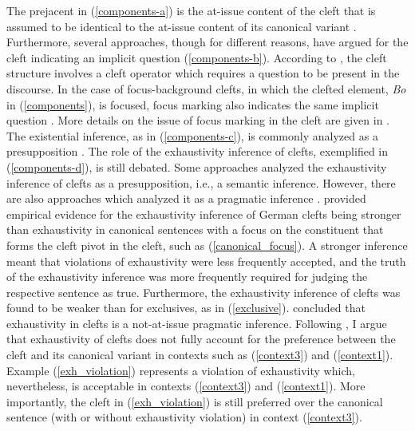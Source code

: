 \documentclass[output=paper,colorlinks,citecolor=brown]{langscibook}
\begin{document}
The prejacent in (\ref{components-a}) is the at-issue content of the cleft that is assumed to be identical to the at-issue content of its canonical variant \citep[see][]{deveaugh-geiss_et_al_2018b}. Furthermore, several approaches, though for different reasons, have argued for the cleft indicating an implicit question (\ref{components-b}). According to \citet{velleman_et_al_2012}, the cleft structure involves a cleft operator which requires a question to be present in the discourse. In the case of focus-background clefts, in which the clefted element, \textit{Bo} in (\ref{components}), is focused, focus marking also indicates the same implicit question \citep{krifka_musan_2012}. More details on the issue of focus marking in the cleft are given in . The existential inference, as in (\ref{components-c}), is commonly analyzed as a presupposition \citep[e.g.,][]{halvorsen_1978,prince_1978,percus_1997}. The role of the exhaustivity inference of clefts, exemplified in (\ref{components-d}), is still debated. Some approaches \citep[e.g.,][]{szabolcsi_1981,percus_1997,buring_kriz_2013,pollard_yasavul_2015} analyzed the exhaustivity inference of clefts as a presupposition, i.e., a semantic inference. However, there are also approaches which analyzed it as a pragmatic inference \citep[e.g.,][]{horn_1981,deveaugh-geiss_et_al_2015,onea_2019}. \citet{deveaugh-geiss_et_al_2018b} provided empirical evidence for the exhaustivity inference of German clefts being stronger than exhaustivity in canonical sentences with a focus on the constituent that forms the cleft pivot in the cleft, such as (\ref{canonical_focus}). A stronger inference meant that violations of exhaustivity were less frequently accepted, and the truth of the exhaustivity inference was more frequently required for judging the respective sentence as true. Furthermore, the exhaustivity inference of clefts was found to be weaker than for exclusives, as in (\ref{exclusive}).
\z
\citet{deveaugh-geiss_et_al_2018b} concluded that exhaustivity in clefts is a not-at-issue pragmatic inference. Following \citet[663]{tonnis_tonhauser_2022}, I argue that exhaustivity of clefts does not fully account for the preference between the cleft and its canonical variant in contexts such as (\ref{context3}) and (\ref{context1}). Example (\ref{exh_violation}) represents a violation of exhaustivity which, nevertheless, is acceptable in contexts (\ref{context3}) and (\ref{context1}). More importantly, the cleft in (\ref{exh_violation}) is still preferred over the canonical sentence (with or without exhaustivity violation) in context (\ref{context3}).
\end{document}
